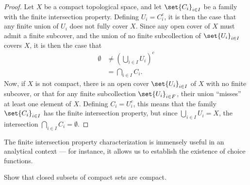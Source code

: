 \documentclass[11pt]{mypackage}
\begin{document}
\begin{proof}
  Let $X$ be a compact topological space, and let $\set{C_i}_{i\in I}$ be a family with the finite intersection property. Defining $U_i = C_i^{c}$, it is then the case that any finite union of $U_i$ does not fully cover $X$. Since any open cover of $X$ must admit a finite subcover, and the union of no finite subcollection of $\set{U_i}_{i\in I}$ covers $X$, it is then the case that
  \begin{align*}
    \emptyset &\neq \left( \bigcup_{i\in I}U_i \right)^{c}\\
              &= \bigcap_{i\in I}C_i.
  \end{align*}
  Now, if $X$ is not compact, there is an open cover $\set{U_i}_{i\in I}$ of $X$ with no finite subcover, or that for any finite subcollection $\set{U_i}_{i\in F}$, their union ``misses'' at least one element of $X$. Defining $C_i = U_i^{c}$, this means that the family $\set{C_i}_{i\in I}$ has the finite intersection property, but since $\bigcup_{i\in I}U_i = X$, the intersection $\bigcap_{i\in I}C_i = \emptyset$.
\end{proof}
The finite intersection property characterization is immensely useful in an analytical context --- for instance, it allows us to establish the existence of choice functions.
\begin{exercise}
  Show that closed subsets of compact sets are compact.
\end{exercise}
\end{document}
